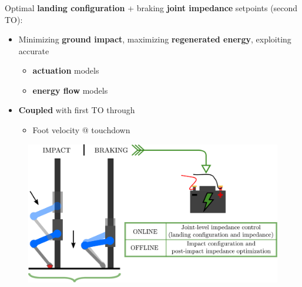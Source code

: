 \documentclass[aspectratio=169]{beamer}
\begin{document}
\begin{frame}
\frametitle{\Large}
\begin{multicols}{2}
Optimal \textbf{landing configuration} + braking \textbf{joint impedance} setpoints (second TO):
\begin{itemize}
\item Minimizing \textbf{ground impact}, maximizing \textbf{regenerated energy}, exploiting accurate\vspace{0.2cm}
\begin{itemize}
\item \textbf{actuation} models
\item \textbf{energy flow} models
\end{itemize}\vspace{0.2cm}
\item \textbf{Coupled} with first TO through\vspace{0.2cm}
\begin{itemize}
\item Foot velocity @ touchdown
\end{itemize}
\end{itemize}
\vfill\null
\columnbreak
\vfill\null
\begin{figure}
    \centering
    \includegraphics[width=1.0\columnwidth]{beamer_imgs/impact_opt_intro/second_TO.pdf}
\end{figure}
\end{multicols}
\end{frame}
\end{document}
